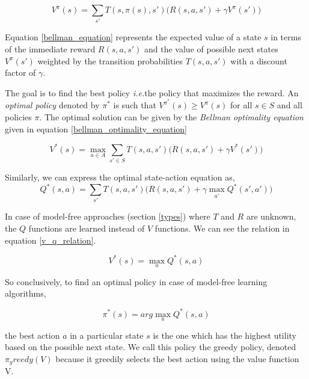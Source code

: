 \documentclass[12pt]{report}
\newcommand{\ie}{\textit{i.e.}}
\begin{document}
\begin{equation}
\label{bellman_equation}
V^\pi(s) = \sum_{s'} T(s,\pi(s),s') \bigg( R(s,a,s') + \gamma V^\pi(s')\bigg) 
\end{equation}

Equation \ref{bellman_equation} represents the expected value of a state $s$ in terms of the immediate reward $R(s,a,s')$ and the value of possible next states $V^\pi(s')$ weighted by the transition probabilities $T(s,a,s')$ with a discount factor of $\gamma$. \par

The goal is to find the best policy \ie the policy that maximizes the reward. An \textit{optimal policy} denoted by $\pi^*$ is such that $V^{\pi^*}(s) \geq V^\pi(s)$
for all $s \in S$ and all policies $\pi$. The optimal solution can be given by the \textit{Bellman optimality equation} given  in equation \ref{bellman_optimality_equation}

\begin{equation}
\label{bellman_optimality_equation}
V^*(s) = \max_{a \in A}\sum_{s' \in S} T(s,a,s') \bigg( R(s,a,s') + \gamma V^*(s')\bigg) 
\end{equation}

Similarly, we can express the optimal state-action equation as, 
\begin{equation}
\label{bellman_optimality_equation}
Q^*(s,a) = \sum_{s'} T(s,a,s') \bigg( R(s,a,s') + \gamma \max_{a'}Q^*(s',a')\bigg) 
\end{equation}

In case of model-free approaches (section \ref{types}) where $T$ and $R$ are unknown, the $Q$ functions are learned instead of $V$ functions. We can see the relation in equation \ref{v_q_relation}.

\begin{equation}
\label{v_q_relation}
V^*(s) = \max_{a}Q^*(s,a)
\end{equation}

So conclusively, to find an optimal policy in case of model-free learning algorithms,

\begin{equation}
\label{v_q_relation}
\pi^*(s) = arg\max_{a}Q^*(s,a)
\end{equation}

the best action $a$ in a particular state $s$ is the one which has the highest utility based on the possible next state. We call this policy the greedy policy, denoted $\pi_greedy(V)$ because it greedily selects the best action using the value function V.
\end{document}
